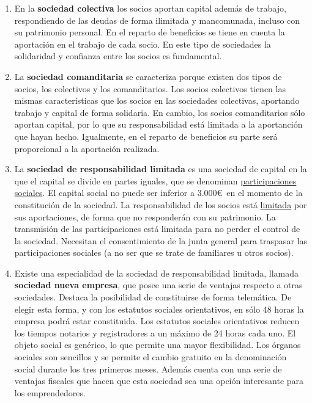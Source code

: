 \documentclass[12pt,a4paper,spanish]{report}
\begin{document}
			\begin{enumerate}
				\item En la \textbf{sociedad colectiva} los socios aportan capital además de trabajo, respondiendo de las deudas de forma ilimitada y mancomunada, incluso con su patrimonio personal. En el reparto de beneficios se tiene en cuenta la aportación en el trabajo de cada socio. En este tipo de sociedades la solidaridad y confianza entre los socios es fundamental.

				\item La \textbf{sociedad comanditaria} se caracteriza porque existen dos tipos de socios, los colectivos y los comanditarios. Los socios colectivos tienen las mismas características que los socios en las sociedades colectivas, aportando trabajo y capital de forma solidaria. En cambio, los socios comanditarios sólo aportan capital, por lo que su responsabilidad está limitada a la aportanción que hayan hecho. Igualmente, en el reparto de beneficios su parte será proporcional a la aportación realizada.

				\item La \textbf{sociedad de responsabilidad limitada} es una sociedad de capital en la que el capital se divide en partes iguales, que se denominan \underline{participaciones sociales}. El capital social no puede ser inferior a 3.000\euro \ en el momento de la constitución de la sociedad. La responsabilidad de los socios está \underline{limitada} por sus aportaciones, de forma que no responderán con su patrimonio. La transmisión de las participaciones está limitada para no perder el control de la sociedad. Necesitan el consentimiento de la junta general para traspasar las participaciones sociales (a no ser que se trate de familiares u otros socios).

				\item Existe una especialidad de la sociedad de responsabilidad limitada, llamada \textbf{sociedad nueva empresa}, que posee una serie de ventajas respecto a otras sociedades. Destaca la posibilidad de constituirse de forma telemática. De elegir esta forma, y con los estatutos sociales orientativos, en sólo 48 horas la empresa podrá estar constituida. Los estatutos sociales orientativos reducen los tiempos notarios y registradores a un máximo de 24 horas cada uno. El objeto social es genérico, lo que permite una mayor flexibilidad. Los órganos sociales son sencillos y se permite el cambio gratuito en la denominación social durante los tres primeros meses. Además cuenta con una serie de ventajas fiscales que hacen que esta sociedad sea una opción interesante para los emprendedores.


\end{enumerate}
\end{document}
